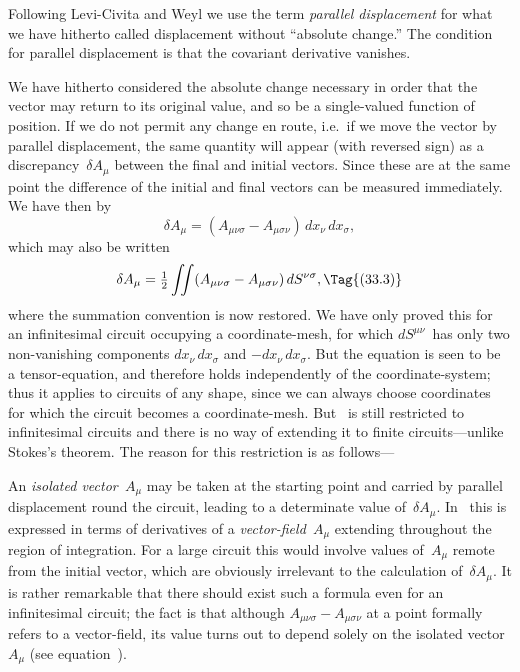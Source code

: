 \documentclass[12pt]{book}
\begin{document}
Following Levi\hyp{}Civita and Weyl we use the term \emph{parallel displacement} for
%
%
what we have hitherto called displacement without ``absolute change.'' The
condition for parallel displacement is that the covariant derivative vanishes.

We have hitherto considered the absolute change necessary in order that
the vector may return to its original value, and so be a single\hyp{}valued function
of position. If we do not permit any change en route, i.e.\ if we move the vector
by parallel displacement, the same quantity will appear (with reversed sign)
as a discrepancy~$\delta A_{\mu}$ between the final and initial vectors. Since these are at
the same point the difference of the initial and final vectors can be measured
immediately. We have then by~
\[
\delta A_{\mu} = (A_{\mu\nu\sigma} - A_{\mu\sigma\nu})\, dx_{\nu}\, dx_{\sigma},
\]
which may also be written
\[
\delta A_{\mu} = \tfrac{1}{2} \iint (A_{\mu\nu\sigma} - A_{\mu\sigma\nu})\, dS^{\nu\sigma},
\Tag{(33.3)}
\]
where the summation convention is now restored. We have only proved this
for an infinitesimal circuit occupying a coordinate\hyp{}mesh, for which $dS^{\mu\nu}$~has
only two non\hyp{}vanishing components $dx_{\nu}\, dx_{\sigma}$ and $-dx_{\nu}\, dx_{\sigma}$. But the equation
is seen to be a tensor\hyp{}equation, and therefore holds independently of the
coordinate\hyp{}system; thus it applies to circuits of any shape, since we can always
choose coordinates for which the circuit becomes a coordinate\hyp{}mesh. But ~is
still restricted to infinitesimal circuits and there is no way of extending it
to finite circuits---unlike Stokes's theorem. The reason for this restriction is as
follows---

An \emph{isolated vector~$A_{\mu}$} may be taken at the starting point and carried by
parallel displacement round the circuit, leading to a determinate value of~$\delta A_{\mu}$.
%
%
In~ this is expressed in terms of derivatives of a \emph{vector\hyp{}field~$A_{\mu}$} extending
throughout the region of integration. For a large circuit this would involve
values of~$A_{\mu}$ remote from the initial vector, which are obviously irrelevant to
the calculation of~$\delta A_{\mu}$. It is rather remarkable that there should exist such
a formula even for an infinitesimal circuit; the fact is that although $A_{\mu\nu\sigma} - A_{\mu\sigma\nu}$
at a point formally refers to a vector\hyp{}field, its value turns out to depend solely
on the isolated vector~$A_{\mu}$ (see equation~).
\end{document}
